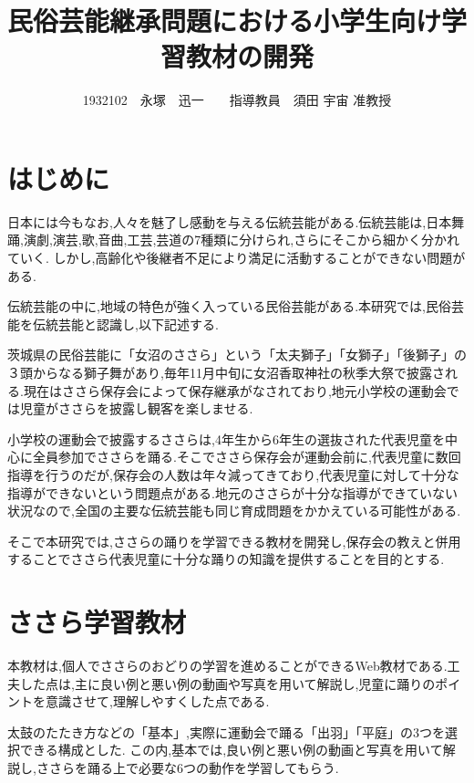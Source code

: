 \documentclass[twocolumn,10pt,a4j]{ltjsarticle}
\title{民俗芸能継承問題における小学生向け学習教材の開発}
\author{1932102　永塚　迅一　　指導教員　須田 宇宙 准教授}
\date{}
\begin{document}
\maketitle
\section{はじめに}


日本には今もなお,人々を魅了し感動を与える伝統芸能がある.伝統芸能は,日本舞踊,演劇,演芸,歌,音曲,工芸,芸道の7種類に分けられ,さらにそこから細かく分かれていく.
しかし,高齢化や後継者不足により満足に活動することができない問題がある.

伝統芸能の中に,地域の特色が強く入っている民俗芸能がある.本研究では,民俗芸能を伝統芸能と認識し,以下記述する.

茨城県の民俗芸能に「女沼のささら」という「太夫獅子」「女獅子」「後獅子」の３頭からなる獅子舞があり,毎年11月中旬に女沼香取神社の秋季大祭で披露される\cite{suda2018}.現在はささら保存会によって保存継承がなされており,地元小学校の運動会では児童がささらを披露し観客を楽しませる.

小学校の運動会で披露するささらは,4年生から6年生の選抜された代表児童を中心に全員参加でささらを踊る.そこでささら保存会が運動会前に,代表児童に数回指導を行うのだが,保存会の人数は年々減ってきており,代表児童に対して十分な指導ができないという問題点がある.地元のささらが十分な指導ができていない状況なので,全国の主要な伝統芸能も同じ育成問題をかかえている可能性がある.

そこで本研究では,ささらの踊りを学習できる教材を開発し,保存会の教えと併用することでささら代表児童に十分な踊りの知識を提供することを目的とする.

\section{ささら学習教材}
本教材は,個人でささらのおどりの学習を進めることができるWeb教材である.工夫した点は,主に良い例と悪い例の動画や写真を用いて解説し,児童に踊りのポイントを意識させて,理解しやすくした点である.

太鼓のたたき方などの「基本」,実際に運動会で踊る「出羽」「平庭」の3つを選択できる構成とした.
この内,基本では,良い例と悪い例の動画と写真を用いて解説し,ささらを踊る上で必要な6つの動作を学習してもらう.
\end{document}
